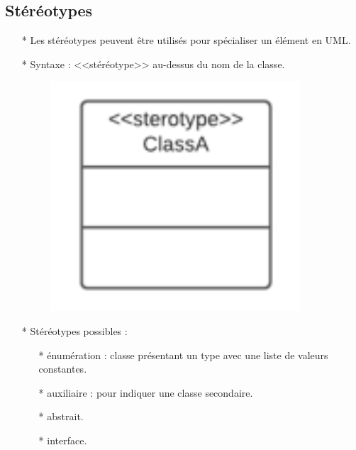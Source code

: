 \documentclass[12pt]{article}
\begin{document}
	\subsection{Stéréotypes}
	\begin{itemize}
		\item[* ] Les stéréotypes peuvent être utilisés pour spécialiser un élément en UML.
		\item[* ] Syntaxe : <<stéréotype>> au-dessus du nom de la classe.
		\newpage
		\begin{figure}[!hbtp]
			\centering
			\includegraphics[scale=0.75]{Capture6.PNG}
		\end{figure}
	\item[* ] Stéréotypes possibles :
	\begin{itemize}
		\item[* ] énumération : classe présentant un type avec une liste de valeurs constantes.
		\item[* ] auxiliaire : pour indiquer une classe secondaire.
		\item[* ] abstrait.
		\item[* ] interface.
	\end{itemize}
	\end{itemize}
\end{document}
